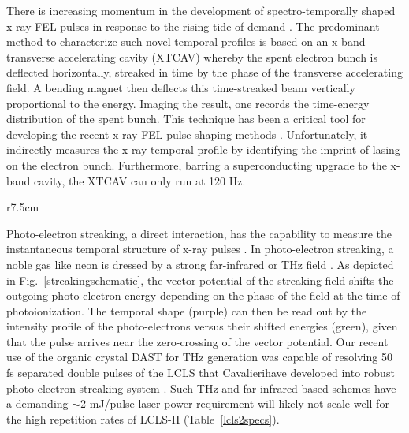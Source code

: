There is increasing momentum in the development of spectro-temporally shaped x-ray FEL pulses \cite{eehg2009,Lutman13_twocolor,Marinelli13_twocolor,Allaria2014,Marinelli2015,Hemsing2016,Prince2016,Lutman2016,Marinelli2016} in response to the rising tide of demand \cite{Mukamel2007,Biggs2012,Mukamel2013,4WaveMixing,TIGER2015}.
The predominant method to characterize such novel temporal profiles is based on an x-band transverse accelerating cavity (XTCAV) \cite{xtcav2014} whereby the spent electron bunch is deflected horizontally, streaked in time by the phase of the transverse accelerating field.
A bending magnet then deflects this time-streaked beam vertically proportional to the energy.
Imaging the result, one records the time-energy distribution of the spent bunch.
This technique has been a critical tool for developing the recent x-ray FEL pulse shaping methods \cite{Marinelli2015,Marinelli2016}.
Unfortunately, it indirectly measures the x-ray temporal profile by identifying the imprint of lasing on the electron bunch.
Furthermore, barring a superconducting upgrade to the x-band cavity, the XTCAV can only run at 120 Hz.

\begin{wrapfigure}[18]{r}{7.5cm}
\vspace{-\baselineskip}
\centerline{
}
\vspace{-\baselineskip}
\caption{
	\label{streakingschematic} 
	Schematic of linear photo-electron streaking.
}
\end{wrapfigure}

Photo-electron streaking, a direct interaction, has the capability to measure the instantaneous temporal structure of x-ray pulses \cite{Hentschel2001}.
In photo-electron streaking, a noble gas like neon is dressed by a strong far-infrared or THz field \cite{Helml2014,Juranic2014,Schulz2015}.
As depicted in Fig.~\ref{streakingschematic}, the vector potential of the streaking field shifts the outgoing photo-electron energy depending on the phase of the field at the time of photoionization.
The temporal shape (purple) can then be read out by the intensity profile of the photo-electrons versus their shifted energies (green), given that the pulse arrives near the zero-crossing of the vector potential.
Our recent use of the organic crystal DAST \cite{DAST} for THz generation was capable of resolving 50 fs separated double pulses of the LCLS \cite{Matthias2016} that Cavalieri\etal have developed into robust photo-electron streaking system \cite{Schulz2015}.
Such THz and far infrared based schemes \cite{Helml2014,Juranic2014} have a demanding $\sim$2 mJ/pulse laser power requirement will likely not scale well for the high repetition rates of LCLS-II (Table~\ref{lcls2specs}).

